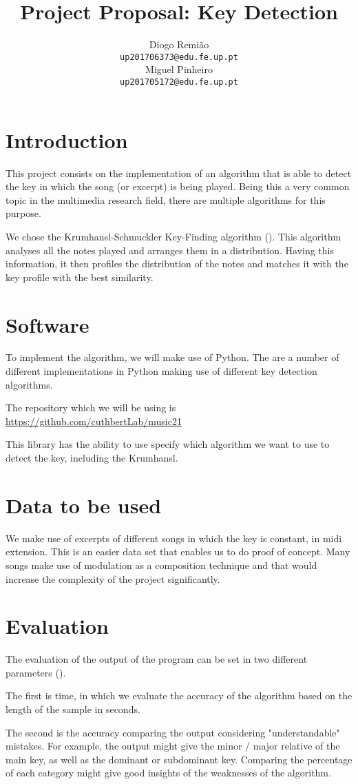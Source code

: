 \documentclass{article} %
\title{Project Proposal: Key Detection}
\author{
Diogo Remião \\
\texttt{up201706373@edu.fe.up.pt} \\
\AND
Miguel Pinheiro \\
\texttt{up201705172@edu.fe.up.pt} \\
}
\begin{document}
\maketitle

\section{Introduction}
This project consists on the implementation of an algorithm that is able to detect the key in which the song (or excerpt) is being played.
Being this a very common topic in the multimedia research field, there are multiple algorithms for this purpose.

We chose the Krumhansl-Schmuckler Key-Finding algorithm (\citeauthor{krumhansl}).
This algorithm analyses all the notes played and arranges them in a distribution.
Having this information, it then profiles the distribution of the notes and matches it with the key profile with the best similarity.

\section{Software}
To implement the algorithm, we will make use of Python.
The are a number of different implementations in Python making use of different key detection algorithms.

The repository which we will be using is \url{https://github.com/cuthbertLab/music21}

This library has the ability to use specify which algorithm we want to use to detect the key, including the Krumhansl.



\section{Data to be used}
We make use of excerpts of different songs in which the key is constant, in midi extension.
This is an easier data set that enables us to do proof of concept.
Many songs make use of modulation as a composition technique and that would increase the complexity of the project significantly.


\section{Evaluation}
The evaluation of the output of the program can be set in two different parameters (\citeauthor{inproceedings}).

The first is time, in which we evaluate the accuracy of the algorithm based on the length of the sample in seconds.

The second is the accuracy comparing the output considering "understandable" mistakes.
For example, the output might give the minor / major relative of the main key, as well as the dominant or subdominant key.
Comparing the percentage of each category might give good insights of the weaknesses of the algorithm.

\nocite{Gjerdingen}



\end{document}

